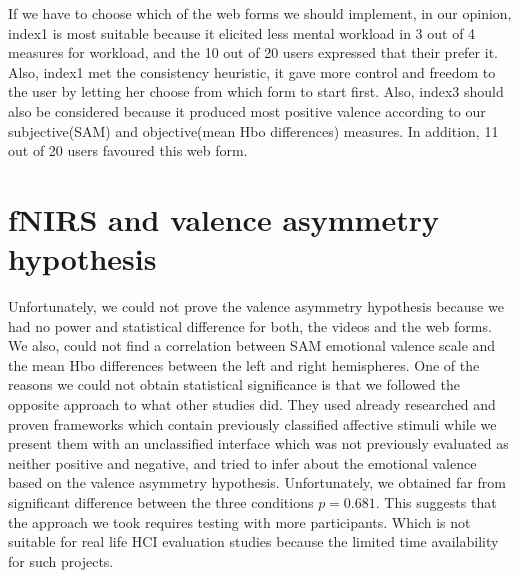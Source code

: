 \documentclass[a4paper]{report}
\begin{document}
			If we have to choose which of the web forms we should implement, in our opinion, index1 is most suitable because it elicited less mental workload in 3 out of 4 measures for workload, and the 10 out of 20 users expressed that their prefer it.	Also, index1 met the consistency heuristic, it gave more control and freedom to the user by letting her choose from which form to start first. 	
			Also, index3 should also be considered because it produced most positive valence according to our subjective(SAM) and objective(mean Hbo differences) measures. In addition, 11 out of 20 users favoured this web form.
				
	\section{fNIRS and valence asymmetry hypothesis}
		Unfortunately, we could not prove the valence asymmetry hypothesis\cite{davidson1992emotion} because we had no power and statistical difference for both, the videos and the web forms. We also, could not find a correlation between SAM emotional valence scale and the mean Hbo differences between the left and right hemispheres. One of the reasons we could not obtain statistical significance is that we followed the opposite approach to what other studies did. They used already researched and proven frameworks which contain previously classified affective stimuli while we present them with an unclassified interface which was not previously evaluated as neither positive and negative, and tried to infer about the emotional valence based on the valence asymmetry hypothesis. Unfortunately, we obtained far from significant difference between the three conditions $p=0.681$. This suggests that the approach we took requires testing with more participants. Which is not suitable for real life HCI evaluation studies because the limited time availability for such projects.
	
\end{document}
